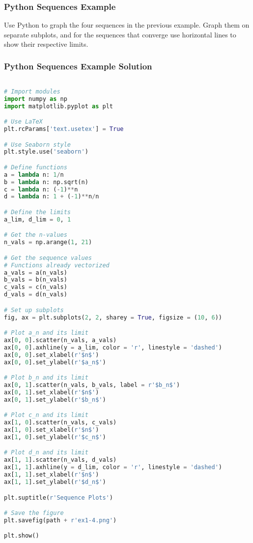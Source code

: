 \documentclass{beamer}
\begin{document}
\begin{frame}[t]
\frametitle{Python Sequences Example}
\begin{Example}
Use Python to graph the four sequences in the previous example. Graph them on separate subplots, and for the sequences that converge use horizontal lines to show their respective limits.
\end{Example}

\end{frame}

\begin{frame}[fragile]
\frametitle{Python Sequences Example Solution}
\begin{multicols}{2}
\begin{lstlisting}[language=Python]

# Import modules 
import numpy as np
import matplotlib.pyplot as plt

# Use LaTeX
plt.rcParams['text.usetex'] = True

# Use Seaborn style
plt.style.use('seaborn')

# Define functions
a = lambda n: 1/n
b = lambda n: np.sqrt(n)
c = lambda n: (-1)**n
d = lambda n: 1 + (-1)**n/n

# Define the limits
a_lim, d_lim = 0, 1

# Get the n-values
n_vals = np.arange(1, 21)

# Get the sequence values
# Functions already vectorized
a_vals = a(n_vals)
b_vals = b(n_vals)
c_vals = c(n_vals)
d_vals = d(n_vals)

# Set up subplots
fig, ax = plt.subplots(2, 2, sharey = True, figsize = (10, 6))

# Plot a_n and its limit
ax[0, 0].scatter(n_vals, a_vals)
ax[0, 0].axhline(y = a_lim, color = 'r', linestyle = 'dashed')
ax[0, 0].set_xlabel(r'$n$')
ax[0, 0].set_ylabel(r'$a_n$')

# Plot b_n and its limit
ax[0, 1].scatter(n_vals, b_vals, label = r'$b_n$')
ax[0, 1].set_xlabel(r'$n$')
ax[0, 1].set_ylabel(r'$b_n$')

# Plot c_n and its limit
ax[1, 0].scatter(n_vals, c_vals)
ax[1, 0].set_xlabel(r'$n$')
ax[1, 0].set_ylabel(r'$c_n$')

# Plot d_n and its limit
ax[1, 1].scatter(n_vals, d_vals)
ax[1, 1].axhline(y = d_lim, color = 'r', linestyle = 'dashed')
ax[1, 1].set_xlabel(r'$n$')
ax[1, 1].set_ylabel(r'$d_n$')

plt.suptitle(r'Sequence Plots')

# Save the figure
plt.savefig(path + r'ex1-4.png')

plt.show()
\end{lstlisting}
\end{multicols}
\end{frame}
\end{document}
